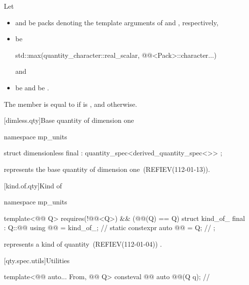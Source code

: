 \pnum
Let
\begin{itemize}
\item
{} and 
be packs denoting the template arguments of
 and , respectively,
\item
{} be
\begin{codeblock}
std::max({quantity_character::real_scalar, @@<Pack>::character...})
\end{codeblock}
and
\item
{} be  and
 be .
\end{itemize}
The member  is equal to
 if  is , and
 otherwise.

[dimless.qty]{Base quantity of dimension one}

\begin{codeblock}
namespace mp_units {

struct dimensionless final : quantity_spec<derived_quantity_spec<>> {};

}
\end{codeblock}

\pnum
{} represents the base quantity of dimension one~(REFIEV(112-01-13)).

[kind.of.qty]{Kind of}

\begin{codeblock}
namespace mp_units {

template<@@ Q>
  requires(!@@<Q>) && (@@(Q{}) == Q{})
struct kind_of_ final : Q::@@ {
  using @@ = kind_of_;                 // \expos
  static constexpr auto @@ = Q{};  // \expos
};

}
\end{codeblock}

\pnum
{} represents a kind of quantity~(REFIEV(112-01-04)) .

[qty.spec.utils]{Utilities}

\begin{itemdecl}
template<@@ auto... From, @@ Q>
consteval @@ auto @@(Q q);    // \expos
\end{itemdecl}


